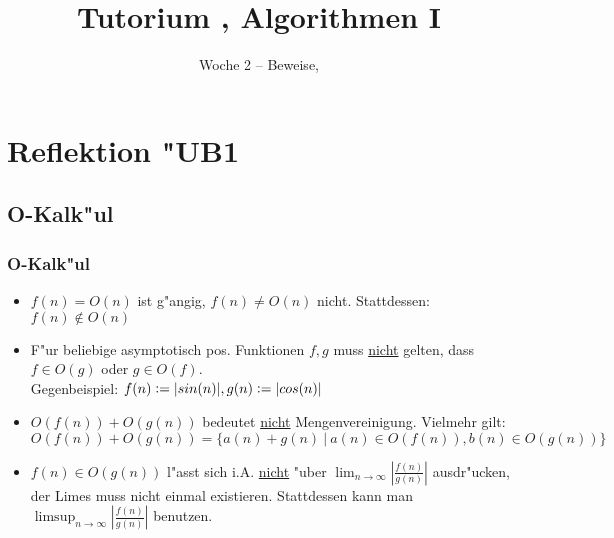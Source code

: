 

\title[Tutorium Algorithmen I]{Tutorium \tutNo, Algorithmen I}
\subtitle{Woche 2 -- Beweise, }



\begin{frame}
  \titlepage
\end{frame}

\section{Reflektion "UB1}
\subsection{O-Kalk"ul}
\begin{frame}
  \frametitle{O-Kalk"ul}
  \begin{itemize}
  \item $f(n) = O(n)$ ist g"angig, $f(n) \neq O(n)$ nicht. Stattdessen: $f(n) \not \in O(n)$
  \item F"ur beliebige asymptotisch pos. Funktionen $f, g$ muss \uline{nicht} gelten,
        dass $f \in O(g)$ oder $g \in O(f)$. \\
        Gegenbeispiel: $f(n) \vcentcolon= |sin(n)|, g(n) \vcentcolon= |cos(n)|$
  \item $O(f(n)) + O(g(n))$ bedeutet \uline{nicht} Mengenvereinigung. Vielmehr gilt:
        $O(f(n)) + O(g(n)) = \{ a(n) + g(n) \ |\  a(n) \in O(f(n)), b(n) \in O(g(n)) \}$
  \item $f(n) \in O(g(n))$ l"asst sich i.A. \uline{nicht} "uber
        $\lim_{n \rightarrow \infty} |\frac{f(n)}{g(n)}|$
        ausdr"ucken, der Limes muss nicht einmal existieren.
        Stattdessen kann man $\limsup_{n \rightarrow \infty} |\frac{f(n)}{g(n)}|$ benutzen.
  \end{itemize}
\end{frame}

